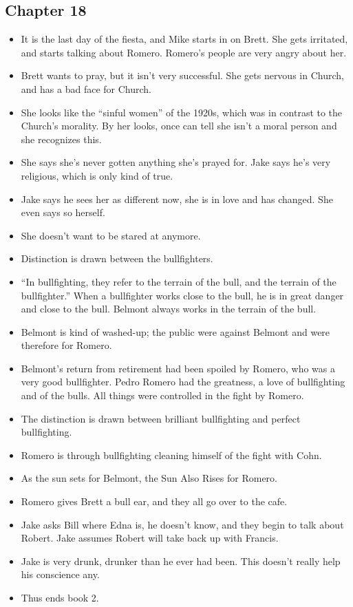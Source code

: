 \documentclass[11pt]{article}
\begin{document}
\subsection{Chapter 18}
\begin{itemize}
	\item It is the last day of the fiesta, and Mike starts in on Brett.  She
		gets irritated, and starts talking about Romero.  Romero's people are very
		angry about her.
	\item Brett wants to pray, but it isn't very successful.  She gets nervous
		in Church, and has a bad face for Church.
	\item She looks like the ``sinful women'' of the 1920s, which was in contrast
		to the Church's morality.  By her looks, once can tell she isn't a moral
		person and she recognizes this.
	\item She says she's never gotten anything she's prayed for.  Jake says he's
		very religious, which is only kind of true.
	\item Jake says he sees her as different now, she is in love and has changed.
		She even says so herself.
	\item She doesn't want to be stared at anymore.
	\item Distinction is drawn between the bullfighters.
	\item ``In bullfighting, they refer to the terrain of the bull, and the
		terrain of the bullfighter.'' When a bullfighter works close to the bull,
		he is in great danger and close to the bull.  Belmont always works in the 
		terrain of the bull.
	\item Belmont is kind of washed-up; the public were against Belmont and were
		therefore for Romero.
	\item Belmont's return from retirement had been spoiled by Romero, who was a
		very good bullfighter.  Pedro Romero had the greatness, a love of
		bullfighting and of the bulls.  All things were controlled in the fight by 
		Romero.
	\item The distinction is drawn between brilliant bullfighting and perfect 
		bullfighting.
	\item Romero is through bullfighting cleaning himself of the fight with Cohn.
	\item As the sun sets for Belmont, the Sun Also Rises for Romero.
	\item Romero gives Brett a bull ear, and they all go over to the cafe.
	\item Jake asks Bill where Edna is, he doesn't know, and they begin to talk
		about Robert.  Jake assumes Robert will take back up with Francis.
	\item Jake is very drunk, drunker than he ever had been.  This doesn't really
		help his conscience any.
	\item Thus ends book 2.
\end{itemize}
\end{document}
